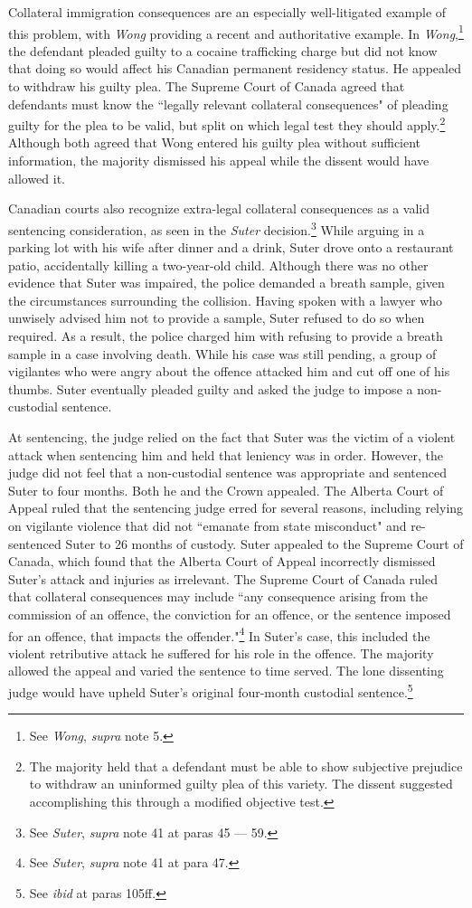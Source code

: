 Collateral immigration consequences are an especially well-litigated example of this problem, with \textit{Wong} providing a recent and authoritative example. In \textit{Wong},\footnote{See \textit{Wong}, \textit{supra} note 5.} the defendant pleaded guilty to a cocaine trafficking charge but did not know that doing so would affect his Canadian permanent residency status. He appealed to withdraw his guilty plea. The Supreme Court of Canada agreed that defendants must know the ``legally relevant collateral consequences" of pleading guilty for the plea to be valid, but split on which legal test they should apply.\footnote{The majority held that a defendant must be able to show subjective prejudice to withdraw an uninformed guilty plea of this variety. The dissent suggested accomplishing this through a modified objective test.} Although both agreed that Wong entered his guilty plea without sufficient information, the majority dismissed his appeal while the dissent would have allowed it.

Canadian courts also recognize extra-legal collateral consequences as a valid sentencing consideration, as seen in the \textit{Suter} decision.\footnote{See \textit{Suter}, \textit{supra} note 41 at paras 45 — 59.} While arguing in a parking lot with his wife after dinner and a drink, Suter drove onto a restaurant patio, accidentally killing a two-year-old child. Although there was no other evidence that Suter was impaired, the police demanded a breath sample, given the circumstances surrounding the collision. Having spoken with a lawyer who unwisely advised him not to provide a sample, Suter refused to do so when required. As a result, the police charged him with refusing to provide a breath sample in a case involving death. While his case was still pending, a group of vigilantes who were angry about the offence attacked him and cut off one of his thumbs. Suter eventually pleaded guilty and asked the judge to impose a non-custodial sentence.

At sentencing, the judge relied on the fact that Suter was the victim of a violent attack when sentencing him and held that leniency was in order. However, the judge did not feel that a non-custodial sentence was appropriate and sentenced Suter to four months. Both he and the Crown appealed. The Alberta Court of Appeal ruled that the sentencing judge erred for several reasons, including relying on vigilante violence that did not ``emanate from state misconduct" and re-sentenced Suter to 26 months of custody. Suter appealed to the Supreme Court of Canada, which found that the Alberta Court of Appeal incorrectly dismissed Suter's attack and injuries as irrelevant. The Supreme Court of Canada ruled that collateral consequences may include ``any consequence arising from the commission of an offence, the conviction for an offence, or the sentence imposed for an offence, that impacts the offender."\footnote{See \textit{Suter}, \textit{supra} note 41 at para 47.} In Suter's case, this included the violent retributive attack he suffered for his role in the offence. The majority allowed the appeal and varied the sentence to time served. The lone dissenting judge would have upheld Suter's original four-month custodial sentence.\footnote{See \textit{ibid} at paras 105ff.}

